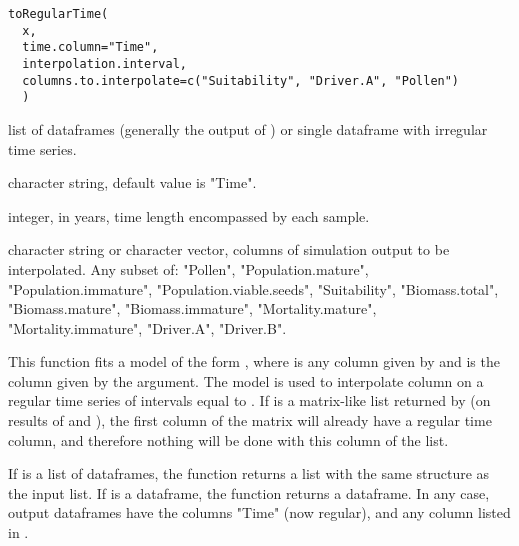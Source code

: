 \documentclass[letterpaper]{book}
\begin{document}
%
\begin{Usage}
\begin{verbatim}
toRegularTime(
  x,
  time.column="Time",
  interpolation.interval,
  columns.to.interpolate=c("Suitability", "Driver.A", "Pollen")
  )
\end{verbatim}
\end{Usage}
%
\begin{Arguments}
\begin{ldescription}
\item[\code{x}] list of dataframes (generally the output of ) or single dataframe  with irregular time series.

\item[\code{time.column}] character string, default value is "Time".

\item[\code{interpolation.interval}] integer, in years, time length encompassed by each sample.

\item[\code{columns.to.interpolate}] character string or character vector, columns of simulation output to be interpolated. Any subset of: "Pollen", "Population.mature", "Population.immature", "Population.viable.seeds", "Suitability", "Biomass.total", "Biomass.mature", "Biomass.immature", "Mortality.mature", "Mortality.immature", "Driver.A", "Driver.B".
\end{ldescription}
\end{Arguments}
%
\begin{Details}\relax
This function fits a  model of the form , where  is any column given by  and  is the column given by the  argument. The model is used to interpolate column  on a regular time series of intervals equal to . If  is a matrix-like list returned by  (on results of  and ), the first column of the matrix will already have a regular time column, and therefore nothing will be done with this column of the list.
\end{Details}
%
\begin{Value}
If  is a list of dataframes, the function returns a list with the same structure as the input list. If  is a dataframe, the function returns a dataframe. In any case, output dataframes have the columns "Time" (now regular), and any column listed in .
\end{Value}
\end{document}
